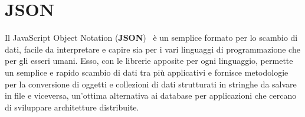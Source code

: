\section{JSON}
\label{sub:json}
Il JavaScript Object Notation (\textbf{JSON})~\cite{json} è un semplice formato per lo scambio di dati,
facile da interpretare e capire sia per i vari linguaggi di programmazione che per gli esseri umani.
Esso, con le librerie apposite per ogni linguaggio, permette un semplice e rapido scambio
di dati tra più applicativi e fornisce metodologie per la conversione di oggetti e collezioni
di dati strutturati in stringhe da salvare in file e viceversa, un’ottima alternativa ai database
per applicazioni che cercano di sviluppare architetture distribuite.
